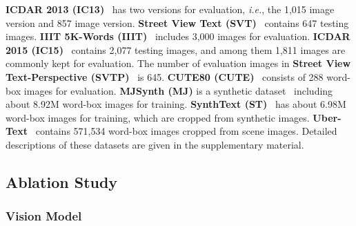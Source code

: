 \documentclass[10pt,journal,compsoc]{IEEEtran}
\def\ie{{\it i.e.}\xspace}
\begin{document}
\textbf{ICDAR 2013 (IC13)}~\cite{karatzas2013icdar} has two versions for evaluation, \ie, the 1,015 image version and 857 image version. \textbf{Street View Text (SVT)}~\cite{wang2011end} contains 647 testing images. \textbf{IIIT 5K-Words (IIIT)}~\cite{mishra2012scene} includes 3,000 images for evaluation. \textbf{ICDAR 2015 (IC15)}~\cite{karatzas2015icdar} contains 2,077 testing images, and among them 1,811 images are commonly kept for evaluation. The number of evaluation images in \textbf{Street View Text-Perspective (SVTP)}~\cite{quy2013recognizing} is 645. \textbf{CUTE80 (CUTE)}~\cite{risnumawan2014robust} consists of 288 word-box images for evaluation. \textbf{MJSynth (MJ)} is a synthetic dataset~\cite{jaderberg2014synthetic,jaderberg2016reading} including about 8.92M word-box images for training. \textbf{SynthText (ST)}~\cite{gupta2016synthetic} has about 6.98M word-box images for training, which are cropped from synthetic images. \textbf{Uber-Text}~\cite{Ying2017UberText} contains 571,534 word-box images cropped from scene images. Detailed descriptions of these datasets are given in the supplementary material.


\subsection{Ablation Study}
\subsubsection{Vision Model}
\end{document}
